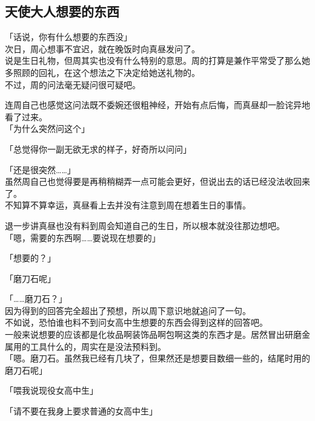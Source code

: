 \subsection{天使大人想要的东西}

「话说，你有什么想要的东西没」\\

次日，周心想事不宜迟，就在晚饭时向真昼发问了。\\

说是生日礼物，但周其实也没有什么特别的意思。周的打算是兼作平常受了那么她多照顾的回礼，在这个想法之下决定给她送礼物的。\\

不过，周的问法毫无疑问很可疑吧。

连周自己也感觉这问法既不委婉还很粗神经，开始有点后悔，而真昼却一脸诧异地看了过来。\\

「为什么突然问这个」

「总觉得你一副无欲无求的样子，好奇所以问问」

「还是很突然……」\\

虽然周自己也觉得要是再稍稍糊弄一点可能会更好，但说出去的话已经没法收回来了。\\

不知算不算幸运，真昼看上去并没有注意到周在想着生日的事情。

退一步讲真昼也没有料到周会知道自己的生日，所以根本就没往那边想吧。\\

「嗯，需要的东西啊……要说现在想要的」

「想要的？」

「磨刀石呢」

「……磨刀石？」\\

因为得到的回答完全超出了预想，所以周下意识地就追问了一句。\\

不如说，恐怕谁也料不到问女高中生想要的东西会得到这样的回答吧。\\

一般来说想要的应该都是化妆品啊装饰品啊包啊这类的东西才是。居然冒出研磨金属用的工具什么的，周实在是没法预料到。\\

「嗯。磨刀石。虽然我已经有几块了，但果然还是想要目数细一些的，结尾时用的磨刀石呢」

「喂我说现役女高中生」

「请不要在我身上要求普通的女高中生」\\

